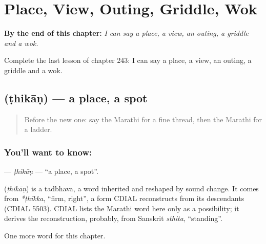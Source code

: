 
\chapter{Place, View, Outing, Griddle, Wok}
\label{ch:mr-place-view-outing-griddle-wok}

\begin{chapteropening}
\textbf{By the end of this chapter:} \emph{I can say a place, a view, an outing, a griddle and a wok.}

Complete the last lesson of chapter 243: I can say a place, a view, an outing, a griddle and a wok.
\end{chapteropening}

\section[\texorpdfstring{\mr{ठिकाण} (ṭhikāṇ)}{ठिकाण (ṭhikāṇ)}]{ (ṭhikāṇ) — a place, a spot}

\label{lesson:MR-C243-thikan}



\begin{quote}
Before the new one: say the Marathi for a fine thread, then the Marathi for a ladder.
\end{quote}

\subsection*{You'll want to know: }
\textbf{} — \emph{ṭhikāṇ} — \textquotedblleft{}a place, a spot\textquotedblright{}.

\begin{cousinweb}
\textbf{} (\emph{ṭhikāṇ}) is a tadbhava, a word inherited and reshaped by sound change. It comes from \emph{*ṭhīkka}, \textquotedblleft{}firm, right\textquotedblright{}, a form CDIAL reconstructs from its descendants (CDIAL 5503). CDIAL lists the Marathi word here only as a possibility; it derives the reconstruction, probably, from Sanskrit \emph{sthita}, \textquotedblleft{}standing\textquotedblright{}.
\end{cousinweb}

\begin{grammarlens}[title={What you've built}]
One more word for this chapter.
\end{grammarlens}

